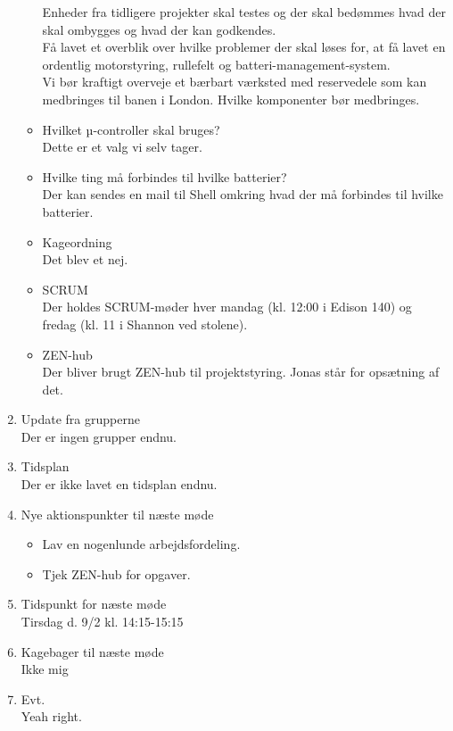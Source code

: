\begin{enumerate}
\begin{itemize}
				Enheder fra tidligere projekter skal testes og der skal bedømmes hvad der skal ombygges og hvad der kan godkendes.\\
				Få lavet et overblik over hvilke problemer der skal løses for, at få lavet en ordentlig motorstyring, rullefelt og batteri-management-system.\\
				Vi bør kraftigt overveje et bærbart værksted med reservedele som kan medbringes til banen i London. Hvilke komponenter bør medbringes.
			\item Hvilket µ-controller skal bruges?\\
				Dette er et valg vi selv tager.
			\item Hvilke ting må forbindes til hvilke batterier?\\
				Der kan sendes en mail til Shell omkring hvad der må forbindes til hvilke batterier.
			\item Kageordning\\
				Det blev et nej.
			\item SCRUM\\
				Der holdes SCRUM-møder hver mandag (kl. 12:00 i Edison 140) og fredag (kl. 11 i Shannon ved stolene). 
			\item ZEN-hub\\
				Der bliver brugt ZEN-hub til projektstyring. Jonas står for opsætning af det.
		\end{itemize}
		\item Update fra grupperne\\
			Der er ingen grupper endnu.
		\item Tidsplan\\
			Der er ikke lavet en tidsplan endnu.
		\item Nye aktionspunkter til næste møde
		\begin{itemize}
			\itemsep 0.3em 
			\item Lav en nogenlunde arbejdsfordeling.
			\item Tjek ZEN-hub for opgaver.
		\end{itemize}
		\item Tidspunkt for næste møde\\
			Tirsdag d. 9/2 kl. 14:15-15:15
		\item Kagebager til næste møde\\
			Ikke mig
		\item Evt.\\
			Yeah right.
	\end{enumerate}
